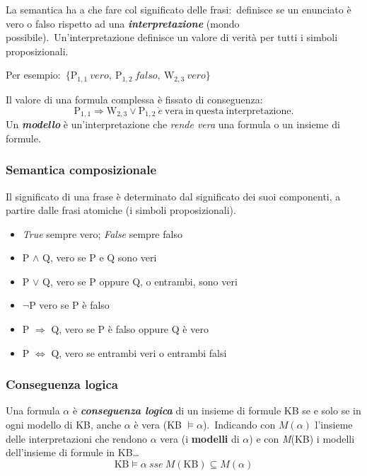 La semantica ha a che fare col significato delle frasi:\ definisce se un enunciato è vero o falso rispetto ad una \textbf{\textit{interpretazione}} (mondo possibile).\
Un'interpretazione definisce un valore di verità per tutti i simboli proposizionali.\

\vspace{12pt}
Per esempio:\ $\{\mathrm{P}_{1,1}\ \mathit{vero},\ \mathrm{P}_{1,2}\ \mathit{falso},\ \mathrm{W}_{2,3}\ \mathit{vero}\}$

\vspace{12pt}

\noindent Il valore di una formula complessa è fissato di conseguenza:
\[\mathrm{P}_{1,1} \Rightarrow \mathrm{W}_{2,3} \lor \mathrm{P}_{1,2}\ \grave{e}\ \mathrm{vera\ in\ questa\ interpretazione}.\]
Un \textbf{\textit{modello}} è un'interpretazione che \textit{rende vera} una formula o un insieme di formule.\

\subsubsection{Semantica composizionale}
Il significato di una frase è determinato dal significato dei suoi componenti, a partire dalle frasi atomiche (i simboli proposizionali).\
\begin{itemize}
	\item \textit{True} sempre vero; \textit{False} sempre falso
	\item P $\land$ Q, vero se P e Q sono veri
	\item P $\lor$ Q, vero se P oppure Q, o entrambi, sono veri
	\item $\lnot$P  vero se P è falso
	\item P $ \Rightarrow$ Q, vero se P è falso oppure Q è vero
	\item P $ \Leftrightarrow$ Q,  vero se entrambi veri o entrambi falsi
\end{itemize}

\subsubsection{Conseguenza logica}

Una formula $\alpha$ è \textbf{\textit{conseguenza logica}} di un insieme di formule KB se e solo se in ogni modello di KB, anche $\alpha$ è vera (KB $\models \alpha$).\
Indicando con $M(\alpha)$ l'insieme delle interpretazioni che rendono $\alpha$ vera (i \textbf{modelli} di $\alpha$) e con \textit{M}(KB) i modelli dell'insieme di formule in KB\dots
\[
	\mathrm{KB} \models \alpha\  sse\  M(\mathrm{KB}) \subseteq M(\alpha)
\]

